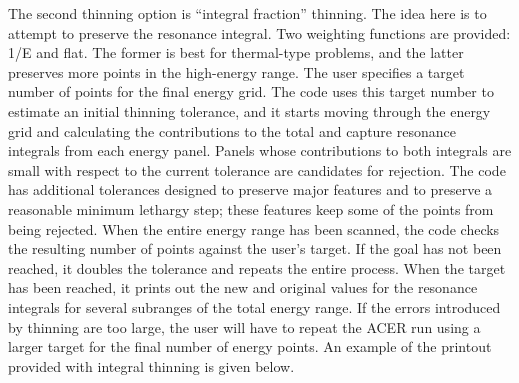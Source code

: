 The second thinning option is ``integral fraction'' thinning.
The idea here is to attempt to preserve the resonance integral.  Two
weighting functions are provided: 1/E and flat.  The former is best
for thermal-type problems, and the latter preserves more points in
the high-energy range.  The user specifies a target number of points
for the final energy grid.  The code uses this target number to
estimate an initial thinning tolerance, and it starts moving through
the energy grid and calculating the contributions to the total and
capture resonance integrals from each energy panel.  Panels whose
contributions to both integrals are small with respect to the current
tolerance are candidates for rejection.  The code has additional
tolerances designed to preserve major features and to preserve a
reasonable minimum lethargy step; these features keep some of the
points from being rejected.  When the entire energy range has been
scanned, the code checks the resulting number of points against the
user's target.  If the goal has not been reached, it doubles the
tolerance and repeats the entire process.  When the target has been
reached, it prints out the new and original values for the resonance
integrals for several subranges of the total energy range.  If the
errors introduced by thinning are too large, the user will have to
repeat the ACER run using a larger target for the final number of
energy points.  An example of the printout provided with integral
thinning is given below.

